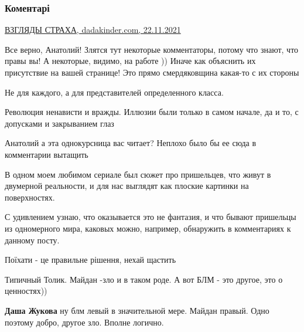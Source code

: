  
 
 
 
 
\subsubsection{Коментарі}
\label{sec:22_11_2021.fb.uljanov_anatolij.1.maidan.cmt}

\begin{itemize} %
\href{https://dadakinder.com/txt/2021/11/maidan-2021}{%
ВЗГЛЯДЫ СТРАХА, dadakinder.com, 22.11.2021%
}


Все верно, Анатолий! Злятся тут некоторые комментаторы, потому что знают, что
правы вы! А некоторые, видимо, на работе )) Иначе как объяснить их присутствие
на вашей странице! Это прямо смердяковщина какая-то с их стороны

Не для каждого, а для представителей определенного класса.

Революция ненависти и вражды. Иллюзии были только в самом начале, да и то, с допусками и закрыванием глаз

Анатолий а эта однокурсница вас читает? Неплохо было бы ее сюда в комментарии вытащить


В одном моем любимом сериале был сюжет про пришельцев, что живут в двумерной
реальности, и для нас выглядят как плоские картинки на поверхностях.

С удивлением узнаю, что оказывается это не фантазия, и что бывают пришельцы из
одномерного мира, каковых можно, например, обнаружить в комментариях к данному
посту.


Поїхати - це правильне рішення, нехай щастить

Типичный Толик. Майдан -зло и в таком роде. А вот БЛМ - это другое, это о ценностях))

\begin{itemize} %
\textbf{Даша Жукова} ну блм левый в значительной мере. Майдан правый. Одно поэтому добро, другое зло. Вполне логично.


\end{itemize}
\end{itemize}
